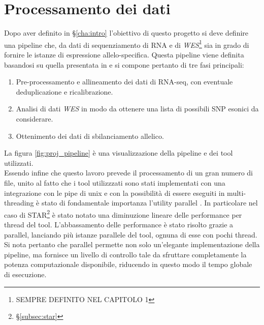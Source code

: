 \graphicspath{{chapters/03/media/}}
\chapter{Processamento dei dati}
\label{cha:processamento}
Dopo aver definito in \S\ref{cha:intro} l'obiettivo di questo progetto si deve definire una pipeline che, da dati di sequenziamento di RNA e di \emph{WES}\footnote{SEMPRE DEFINITO NEL CAPITOLO 1} sia in grado di fornire le istanze di espressione allelo-specifica.
Questa pipeline viene definita basandosi su quella presentata in \cite{ase_pipeline} e si compone pertanto di tre fasi principali:
\begin{enumerate}
	\item Pre-processamento e allineamento dei dati di RNA-seq, con eventuale deduplicazione e ricalibrazione.
	\item Analisi di dati \emph{WES} in modo da ottenere una lista di possibili SNP esonici da considerare.
	\item Ottenimento dei dati di sbilanciamento allelico.
\end{enumerate}
La figura \ref{fig:proj_pipeline} \`e una visualizzazione della pipeline e dei tool utilizzati.\\
Essendo infine che questo lavoro prevede il processamento di un gran numero di file, unito al fatto che i tool utilizzzati sono stati implementati con una integrazione con le pipe di unix e con la possibilit\`a di essere eseguiti in multi-threading \`e stato di fondamentale importanza l'utility parallel \cite{parallel}.
In particolare nel caso di STAR\footnote{\S\ref{subsec:star}} \`e stato notato una diminuzione lineare delle performance per thread del tool.
L'abbassamento delle performance \`e stato risolto grazie a parallel, lanciando pi\`u istanze parallele del tool, ognuna di esse con pochi thread.
Si nota pertanto che parallel permette non solo un'elegante implementazione della pipeline, ma fornisce un livello di controllo tale da sfruttare completamente la potenza computazionale disponibile, riducendo in questo modo il tempo globale di esecuzione.


